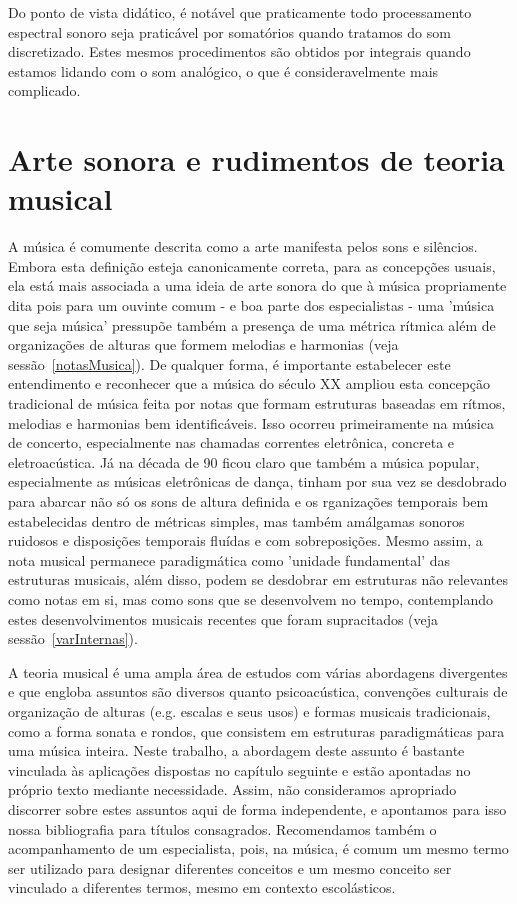 Do ponto de vista didático, é notável que praticamente todo processamento espectral sonoro seja praticável por somatórios quando tratamos do som discretizado. Estes mesmos procedimentos são obtidos por integrais quando estamos lidando com o som analógico, o que é consideravelmente mais complicado.




    \section{Arte sonora e rudimentos de teoria musical}

A música é comumente descrita como a arte manifesta pelos sons e silêncios. Embora esta definição esteja canonicamente correta, para as concepções usuais, ela está mais associada a uma ideia de arte sonora do que à música propriamente dita pois para um ouvinte comum - e boa parte dos especialistas - uma 'música que seja música' pressupõe também a presença de uma métrica rítmica além de organizações de alturas que formem melodias e harmonias (veja sessão~\ref{notasMusica}). De qualquer forma, é importante estabelecer este entendimento e reconhecer que a música do século XX ampliou esta concepção tradicional de música feita por notas que formam estruturas baseadas em rítmos, melodias e harmonias bem identificáveis. Isso ocorreu primeiramente na música de concerto, especialmente nas chamadas correntes eletrônica, concreta e eletroacústica. Já na década de 90 ficou claro que também a música popular, especialmente as músicas eletrônicas de dança, tinham por sua vez se desdobrado para abarcar não só os sons de altura definida e os rganizações temporais bem estabelecidas dentro de métricas simples, mas também amálgamas sonoros ruidosos e disposições temporais fluídas e com sobreposições. Mesmo assim, a nota musical permanece paradigmática como 'unidade fundamental' das estruturas musicais, além disso, podem se desdobrar em estruturas não relevantes como notas em si, mas como sons que se desenvolvem no tempo, contemplando estes desenvolvimentos musicais recentes que foram supracitados (veja sessão~\ref{varInternas}).

A teoria musical é uma ampla área de estudos com várias abordagens divergentes e que engloba assuntos são diversos quanto psicoacústica, convenções culturais de organização de alturas (e.g. escalas e seus usos) e formas musicais tradicionais, como a forma sonata e rondos, que consistem em estruturas paradigmáticas para uma música inteira. Neste trabalho, a abordagem deste assunto é bastante vinculada às aplicações dispostas no capítulo seguinte e estão apontadas no próprio texto mediante necessidade. Assim, não consideramos apropriado discorrer sobre estes assuntos aqui de forma independente, e apontamos para isso nossa bibliografia para títulos consagrados. Recomendamos também o acompanhamento de um especialista, pois, na música, é comum um mesmo termo ser utilizado para designar diferentes conceitos e um mesmo conceito ser vinculado a diferentes termos, mesmo em contexto escolásticos.


